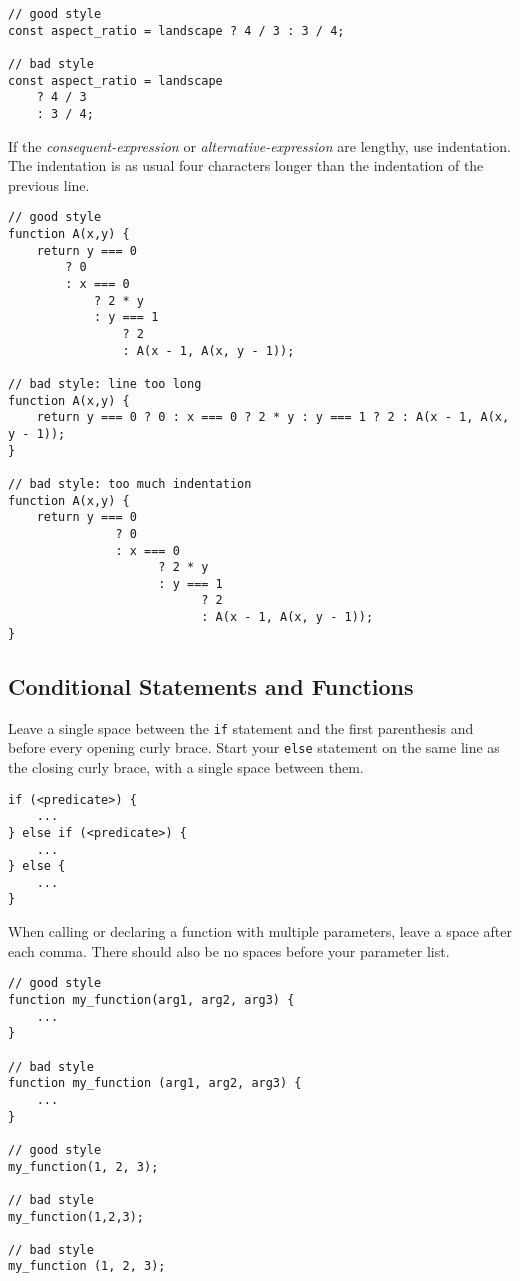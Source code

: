 \begin{lstlisting}
// good style
const aspect_ratio = landscape ? 4 / 3 : 3 / 4;

// bad style
const aspect_ratio = landscape
    ? 4 / 3
    : 3 / 4;
\end{lstlisting}

If the \textit{consequent-expression} or \textit{alternative-expression} are lengthy, use
indentation. The indentation is as usual four characters longer
than the indentation of the previous line.

\begin{lstlisting}
// good style
function A(x,y) {
    return y === 0
        ? 0
        : x === 0
            ? 2 * y
            : y === 1
                ? 2
                : A(x - 1, A(x, y - 1));

// bad style: line too long
function A(x,y) {
    return y === 0 ? 0 : x === 0 ? 2 * y : y === 1 ? 2 : A(x - 1, A(x, y - 1));
}

// bad style: too much indentation
function A(x,y) {
    return y === 0
               ? 0
               : x === 0
                     ? 2 * y
                     : y === 1
                           ? 2
                           : A(x - 1, A(x, y - 1));
}
\end{lstlisting}

  \subsection*{Conditional Statements and Functions}
  Leave a single space between the \lstinline{if} statement and the first parenthesis and before every opening curly brace.
  Start your \lstinline{else} statement on the same line as the closing curly brace, with a single space between them.

\begin{lstlisting}
if (<predicate>) {
    ...
} else if (<predicate>) {
    ...
} else {
    ...
}
\end{lstlisting}

  When calling or declaring a function with multiple parameters, leave a space after each comma.
  There should also be no spaces before your parameter list.

\begin{lstlisting}
// good style
function my_function(arg1, arg2, arg3) {
    ...
}

// bad style
function my_function (arg1, arg2, arg3) {
    ...
}

// good style
my_function(1, 2, 3);

// bad style
my_function(1,2,3);

// bad style
my_function (1, 2, 3);
\end{lstlisting}

